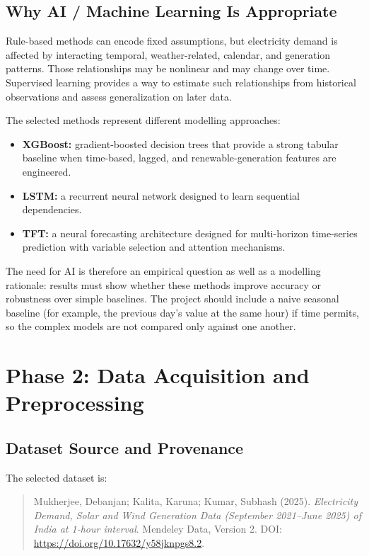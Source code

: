 \documentclass[12pt,a4paper]{article}
\begin{document}
\subsection{Why AI / Machine Learning Is Appropriate}
Rule-based methods can encode fixed assumptions, but electricity demand is affected by interacting temporal, weather-related, calendar, and generation patterns. Those relationships may be nonlinear and may change over time. Supervised learning provides a way to estimate such relationships from historical observations and assess generalization on later data.

The selected methods represent different modelling approaches:
\begin{itemize}[leftmargin=*]
  \item \textbf{XGBoost:} gradient-boosted decision trees that provide a strong tabular baseline when time-based, lagged, and renewable-generation features are engineered.
  \item \textbf{LSTM:} a recurrent neural network designed to learn sequential dependencies.
  \item \textbf{TFT:} a neural forecasting architecture designed for multi-horizon time-series prediction with variable selection and attention mechanisms.
\end{itemize}
The need for AI is therefore an empirical question as well as a modelling rationale: results must show whether these methods improve accuracy or robustness over simple baselines. The project should include a naive seasonal baseline (for example, the previous day's value at the same hour) if time permits, so the complex models are not compared only against one another.

\section{Phase 2: Data Acquisition and Preprocessing}

\subsection{Dataset Source and Provenance}
The selected dataset is:
\begin{quote}
Mukherjee, Debanjan; Kalita, Karuna; Kumar, Subhash (2025). \textit{Electricity Demand, Solar and Wind Generation Data (September 2021--June 2025) of India at 1-hour interval}. Mendeley Data, Version 2. DOI: \url{https://doi.org/10.17632/y58jknpgs8.2}.
\end{quote}
\end{document}
